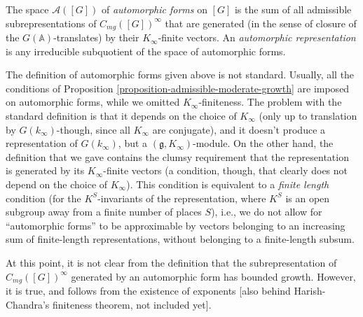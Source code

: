 \begin{definition}
 \label{definition-automorphic-representation}
The space $\mathcal A([G])$ of {\it automorphic forms} on $[G]$ is the sum of all admissible subrepresentations of $C_{mg}([G])^\infty$ that are generated (in the sense of closure of the $G(\mathbb A)$-translates) by their $K_\infty$-finite vectors. An {\it automorphic representation} is any irreducible subquotient of the space of automorphic forms. 
\end{definition}

\begin{remark}
 \label{remark-automorphic-representation}
The definition of automorphic forms given above is not standard. Usually, all the conditions of Proposition \ref{proposition-admissible-moderate-growth} are imposed on automorphic forms, while we omitted $K_\infty$-finiteness. The problem with the standard definition is that it depends on the choice of $K_\infty$ (only up to translation by $G(k_\infty)$-though, since all $K_\infty$ are conjugate), and it doesn't produce a representation of $G(k_\infty)$, but a $(\mathfrak g, K_\infty)$-module. On the other hand, the definition that we gave contains the clumsy requirement that the representation is generated by its $K_\infty$-finite vectors (a condition, though, that clearly does not depend on the choice of $K_\infty$). This condition is equivalent to a \emph{finite length} condition (for the $K^S$-invariants of the representation, where $K^S$ is an open subgroup away from a finite number of places $S$), i.e., we do not allow for ``automorphic forms'' to be approximable by vectors belonging to an increasing sum of finite-length representations, without belonging to a finite-length subsum.

At this point, it is not clear from the definition that the subrepresentation of $C_{mg}([G])^\infty$ generated by an automorphic form has bounded growth. However, it is true, and follows from the existence of exponents [also behind Harish-Chandra's finiteness theorem, not included yet].
\end{remark}







